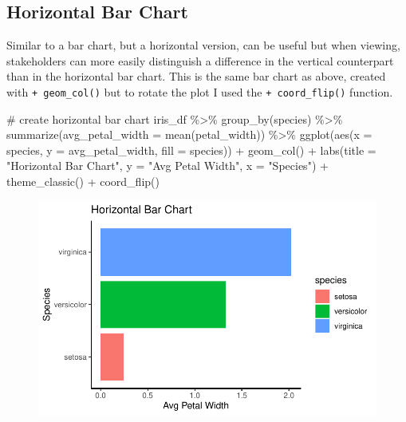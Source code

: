 \documentclass[
  letterpaper,
  DIV=11,
  numbers=noendperiod]{scrreprt}
\newenvironment{Shaded}{\begin{snugshade}}{\end{snugshade}}
\newcommand{\AttributeTok}[1]{\textcolor[rgb]{0.40,0.45,0.13}{#1}}
\newcommand{\CommentTok}[1]{\textcolor[rgb]{0.37,0.37,0.37}{#1}}
\newcommand{\FunctionTok}[1]{\textcolor[rgb]{0.28,0.35,0.67}{#1}}
\newcommand{\NormalTok}[1]{\textcolor[rgb]{0.00,0.23,0.31}{#1}}
\newcommand{\SpecialCharTok}[1]{\textcolor[rgb]{0.37,0.37,0.37}{#1}}
\newcommand{\StringTok}[1]{\textcolor[rgb]{0.13,0.47,0.30}{#1}}
\begin{document}
\hypertarget{horizontal-bar-chart}{%
\subsection{Horizontal Bar Chart}\label{horizontal-bar-chart}}

Similar to a bar chart, but a horizontal version, can be useful but when
viewing, stakeholders can more easily distinguish a difference in the
vertical counterpart than in the horizontal bar chart. This is the same
bar chart as above, created with \texttt{+\ geom\_col()} but to rotate
the plot I used the \texttt{+\ coord\_flip()} function.

\begin{Shaded}
\begin{Highlighting}[]
\CommentTok{\# create horizontal bar chart}
\NormalTok{iris\_df }\SpecialCharTok{\%\textgreater{}\%} 
  \FunctionTok{group\_by}\NormalTok{(species) }\SpecialCharTok{\%\textgreater{}\%}
  \FunctionTok{summarize}\NormalTok{(}\AttributeTok{avg\_petal\_width =} \FunctionTok{mean}\NormalTok{(petal\_width)) }\SpecialCharTok{\%\textgreater{}\%}
  \FunctionTok{ggplot}\NormalTok{(}\FunctionTok{aes}\NormalTok{(}\AttributeTok{x =}\NormalTok{ species, }\AttributeTok{y =}\NormalTok{ avg\_petal\_width, }\AttributeTok{fill =}\NormalTok{ species)) }\SpecialCharTok{+}
  \FunctionTok{geom\_col}\NormalTok{() }\SpecialCharTok{+}
  \FunctionTok{labs}\NormalTok{(}\AttributeTok{title =} \StringTok{"Horizontal Bar Chart"}\NormalTok{, }\AttributeTok{y =} \StringTok{"Avg Petal Width"}\NormalTok{, }\AttributeTok{x =} \StringTok{"Species"}\NormalTok{) }\SpecialCharTok{+}
  \FunctionTok{theme\_classic}\NormalTok{() }\SpecialCharTok{+}
  \FunctionTok{coord\_flip}\NormalTok{()}
\end{Highlighting}
\end{Shaded}

\begin{figure}[H]

{\centering \includegraphics{./visualizing-data_files/figure-pdf/unnamed-chunk-9-1.pdf}

}

\end{figure}
\end{document}
